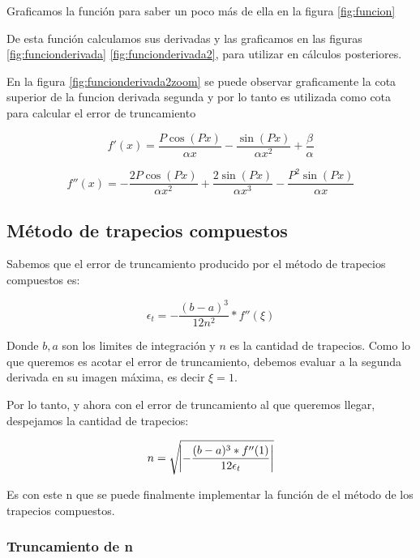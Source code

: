 \documentclass[11pt,a4paper]{article}
\begin{document}
Graficamos la función para saber un poco más de ella en la figura \ref{fig:funcion}


De esta función calculamos sus derivadas y las graficamos en las figuras \ref{fig:funcionderivada} \ref{fig:funcionderivada2}, para utilizar en cálculos posteriores.

En la figura \ref{fig:funcionderivada2zoom} se puede observar graficamente la cota superior de la funcion derivada segunda y por lo tanto es utilizada como cota para calcular el error de truncamiento

\vspace{2cm}

\begin{equation}
    f'(x) = \frac{P \cos{(P x)}}{\alpha x} - \frac{ \sin{(P x)}}{\alpha x^2} + \frac{\beta}{\alpha}
\end{equation}
    
\begin{equation}
f''(x) = - \frac{2 P \cos{(P x)}}{\alpha x^2} + \frac{2 \sin{(P x)}}{\alpha x^3} - \frac{P^2 \sin{(P x)}}{\alpha x}
\end{equation}

\subsection{Método de trapecios compuestos}

Sabemos que el error de truncamiento producido por el método de trapecios compuestos es:

\begin{equation}
    \epsilon_t = - \frac{{(b - a)}^3}{12 n^2} * f''(\xi)
\end{equation}
    
Donde \(b, a\) son los limites de integración y \(n\) es la cantidad de trapecios. Como lo que queremos es acotar el error de truncamiento, debemos evaluar a la segunda derivada en su imagen máxima, es decir \(\xi = 1 \).

Por lo tanto, y ahora con el error de truncamiento al que queremos llegar, despejamos la cantidad de trapecios:

\begin{equation}
    n  = \sqrt{ \abs{ - \frac{(b - a)^3 * f''(1)}{12 \epsilon_t}}} 
\end{equation}


Es con este n que se puede finalmente implementar la función de el método de los trapecios compuestos.

\subsubsection{Truncamiento de n}
\end{document}
